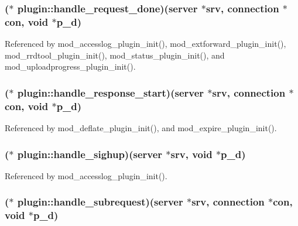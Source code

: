 \hypertarget{structplugin_af9d117621289c84a7cb0d705dbc9f47b}{
\subsubsection[{handle\-\_\-request\-\_\-done}]{($\ast$  plugin\-::handle\-\_\-request\-\_\-done)({\bf server} $\ast$srv, {\bf connection} $\ast$con, void $\ast$p\-\_\-d)}}\label{structplugin_af9d117621289c84a7cb0d705dbc9f47b}


Referenced by mod\-\_\-accesslog\-\_\-plugin\-\_\-init(), mod\-\_\-extforward\-\_\-plugin\-\_\-init(), mod\-\_\-rrdtool\-\_\-plugin\-\_\-init(), mod\-\_\-status\-\_\-plugin\-\_\-init(), and mod\-\_\-uploadprogress\-\_\-plugin\-\_\-init().

\hypertarget{structplugin_a2a517137ba9b9e231e97cceef3f41d5e}{
\subsubsection[{handle\-\_\-response\-\_\-start}]{($\ast$  plugin\-::handle\-\_\-response\-\_\-start)({\bf server} $\ast$srv, {\bf connection} $\ast$con, void $\ast$p\-\_\-d)}}\label{structplugin_a2a517137ba9b9e231e97cceef3f41d5e}


Referenced by mod\-\_\-deflate\-\_\-plugin\-\_\-init(), and mod\-\_\-expire\-\_\-plugin\-\_\-init().

\hypertarget{structplugin_aaa3aaf5324316058a36ab97ab7303a62}{
\subsubsection[{handle\-\_\-sighup}]{($\ast$  plugin\-::handle\-\_\-sighup)({\bf server} $\ast$srv, void $\ast$p\-\_\-d)}}\label{structplugin_aaa3aaf5324316058a36ab97ab7303a62}


Referenced by mod\-\_\-accesslog\-\_\-plugin\-\_\-init().

\hypertarget{structplugin_abf5ea22c50c0dc4ef11047565fbfc9a5}{
\subsubsection[{handle\-\_\-subrequest}]{($\ast$  plugin\-::handle\-\_\-subrequest)({\bf server} $\ast$srv, {\bf connection} $\ast$con, void $\ast$p\-\_\-d)}}\label{structplugin_abf5ea22c50c0dc4ef11047565fbfc9a5}


